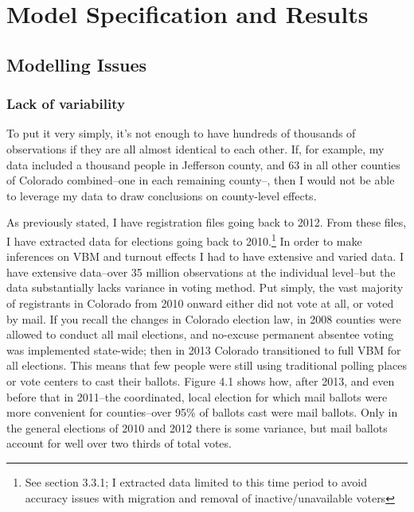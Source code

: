 \documentclass[12pt,twoside]{reedthesis}
\begin{document}
  \chapter{Model Specification and
  Results}\label{model-specification-and-results}
  
  \section{Modelling Issues}\label{modelling-issues}
  
  \subsection{Lack of variability}\label{lack-of-variability}
  
  To put it very simply, it's not enough to have hundreds of thousands of
  observations if they are all almost identical to each other. If, for
  example, my data included a thousand people in Jefferson county, and 63
  in all other counties of Colorado combined--one in each remaining
  county--, then I would not be able to leverage my data to draw
  conclusions on county-level effects.
  
  As previously stated, I have registration files going back to 2012. From
  these files, I have extracted data for elections going back to
  2010.\footnote{See section 3.3.1; I extracted data limited to this time
    period to avoid accuracy issues with migration and removal of
    inactive/unavailable voters} In order to make inferences on VBM and
  turnout effects I had to have extensive and varied data. I have
  extensive data--over 35 million observations at the individual
  level--but the data substantially lacks variance in voting method. Put
  simply, the vast majority of registrants in Colorado from 2010 onward
  either did not vote at all, or voted by mail. If you recall the changes
  in Colorado election law, in 2008 counties were allowed to conduct all
  mail elections, and no-excuse permanent absentee voting was implemented
  state-wide; then in 2013 Colorado transitioned to full VBM for all
  elections. This means that few people were still using traditional
  polling places or vote centers to cast their ballots. Figure 4.1 shows
  how, after 2013, and even before that in 2011--the coordinated, local
  election for which mail ballots were more convenient for counties--over
  95\% of ballots cast were mail ballots. Only in the general elections of
  2010 and 2012 there is some variance, but mail ballots account for well
  over two thirds of total votes.
  
\end{document}
